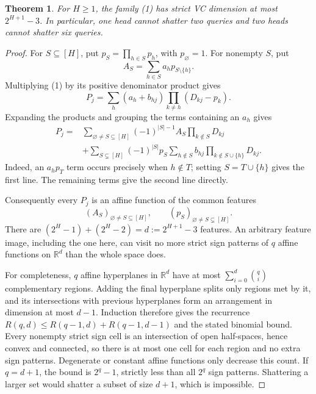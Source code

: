\documentclass[11pt]{article}
\newtheorem{theorem}{Theorem}
\begin{document}
\begin{theorem}
For $H\geq1$, the family (1) has strict VC dimension at most
$2^{H+1}-3$. In particular, one head cannot shatter two queries and two
heads cannot shatter six queries.
\end{theorem}
\begin{proof}
For $S\subseteq[H]$, put $p_S=\prod_{h\in S}p_h$, with $p_\varnothing=1$.
For nonempty $S$, put
\[
 A_S=\sum_{h\in S}a_h p_{S\setminus\{h\}}.
\]
Multiplying (1) by its positive denominator product gives
\[
 P_j=\sum_h(a_h+b_{hj})\prod_{k\ne h}(D_{kj}-p_k).
\]
Expanding the products and grouping the terms containing an $a_h$ gives
\[
 \begin{split}
 P_j={}&\sum_{\varnothing\ne S\subseteq[H]}
       (-1)^{|S|-1} A_S\prod_{k\notin S}D_{kj}\\
 &+\sum_{S\subsetneq[H]}(-1)^{|S|}p_S
       \sum_{h\notin S}b_{hj}
          \prod_{k\notin S\cup\{h\}}D_{kj}.
 \end{split}                                                    \tag{2}
\]
Indeed, an $a_h p_T$ term occurs precisely when $h\notin T$;
setting $S=T\cup\{h\}$ gives the first line. The remaining terms give
the second line directly.

Consequently every $P_j$ is an affine function of the common features
\[
 (A_S)_{\varnothing\ne S\subseteq[H]},\qquad
 (p_S)_{\varnothing\ne S\subsetneq[H]}.
\]
There are $(2^H-1)+(2^H-2)=d:=2^{H+1}-3$ features.
An arbitrary feature image, including the one here, can visit no more
strict sign patterns of $q$ affine functions on $\mathbb R^d$ than the
whole space does.

For completeness, $q$ affine hyperplanes in $\mathbb R^d$ have at most
$\sum_{i=0}^d\binom qi$ complementary regions. Adding the final
hyperplane splits only regions met by it, and its intersections with
previous hyperplanes form an arrangement in dimension at most $d-1$.
Induction therefore gives the recurrence
$R(q,d)\leq R(q-1,d)+R(q-1,d-1)$ and the stated binomial bound.
Every nonempty strict sign cell is an intersection of open half-spaces,
hence convex and connected, so there is at most one cell for each
region and no extra sign patterns. Degenerate or constant affine
functions only decrease this count. If $q=d+1$, the bound is
$2^q-1$, strictly less than all $2^q$ sign patterns. Shattering a larger
set would shatter a subset of size $d+1$, which is impossible.
\end{proof}
\end{document}
